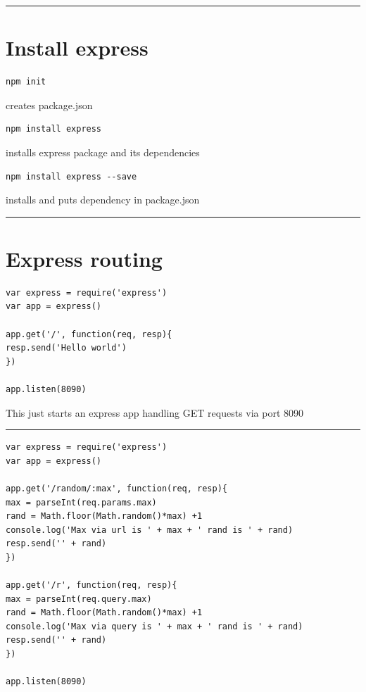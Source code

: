 \documentclass{article}[18pt]
\begin{document}
\begin{center}\rule{0.5\linewidth}{\linethickness}\end{center}
\newpage
\hypertarget{install-express}{%
	\section{Install express}\label{install-express}}

\begin{verbatim}
npm init
\end{verbatim}

creates package.json

\begin{verbatim}
npm install express
\end{verbatim}

installs express package and its dependencies

\begin{verbatim}
npm install express --save
\end{verbatim}

installs and puts dependency in package.json

\begin{center}\rule{0.5\linewidth}{\linethickness}\end{center}

\hypertarget{express-routing}{%
	\section{Express routing}\label{express-routing}}

\begin{verbatim}
var express = require('express')
var app = express()

app.get('/', function(req, resp){
resp.send('Hello world')
})

app.listen(8090)
\end{verbatim}

This just starts an express app handling GET requests via port 8090

\begin{center}\rule{0.5\linewidth}{\linethickness}\end{center}

\begin{verbatim}
var express = require('express')
var app = express()

app.get('/random/:max', function(req, resp){
max = parseInt(req.params.max)
rand = Math.floor(Math.random()*max) +1
console.log('Max via url is ' + max + ' rand is ' + rand)
resp.send('' + rand)
})

app.get('/r', function(req, resp){
max = parseInt(req.query.max)
rand = Math.floor(Math.random()*max) +1
console.log('Max via query is ' + max + ' rand is ' + rand)
resp.send('' + rand)
})

app.listen(8090)
\end{verbatim}
\end{document}
